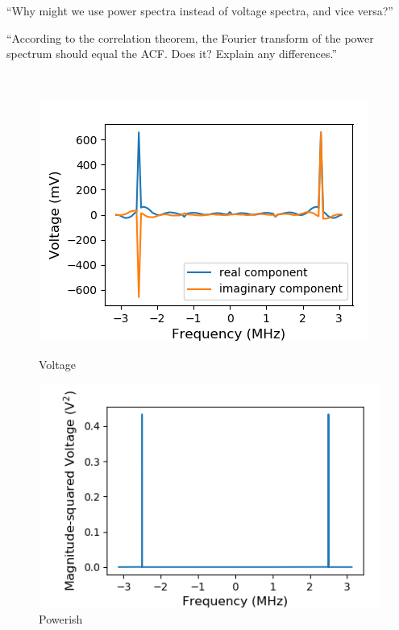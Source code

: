 \documentclass[a4paper]{article}
\begin{document}
``Why might we use power spectra instead of voltage spectra, and vice versa?''

``According to the correlation theorem, the Fourier transform of the power spectrum should equal the ACF. Does it? Explain any differences.''

\

\begin{figure}
\centering
\begin{minipage}{.5\textwidth}
	\centering
	\includegraphics[width=.8\linewidth]{5-3/volt1}
	\caption{Voltage}
	\label{fig:Volt1}
\end{minipage}%
\begin{minipage}{.5\textwidth}
	\centering
	\includegraphics[width=.8\linewidth]{5-3/pow1}
	\caption{Powerish}
	\label{fig:SyPw1}
\end{minipage}
\end{figure}
\end{document}

